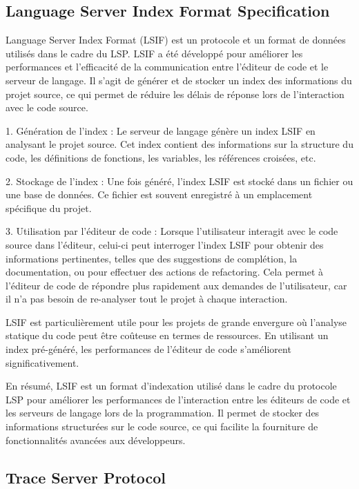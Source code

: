 \subsection{Language Server Index Format Specification}

Language Server Index Format (LSIF) est un protocole et un format de données utilisés dans le cadre du LSP. LSIF a été développé pour améliorer les performances et l'efficacité de la communication entre l'éditeur de code et le serveur de langage. Il s'agit de générer et de stocker un index des informations du projet source, ce qui permet de réduire les délais de réponse lors de l'interaction avec le code source.

1. Génération de l'index : Le serveur de langage génère un index LSIF en analysant le projet source. Cet index contient des informations sur la structure du code, les définitions de fonctions, les variables, les références croisées, etc.

2. Stockage de l'index : Une fois généré, l'index LSIF est stocké dans un fichier ou une base de données. Ce fichier est souvent enregistré à un emplacement spécifique du projet.

3. Utilisation par l'éditeur de code : Lorsque l'utilisateur interagit avec le code source dans l'éditeur, celui-ci peut interroger l'index LSIF pour obtenir des informations pertinentes, telles que des suggestions de complétion, la documentation, ou pour effectuer des actions de refactoring. Cela permet à l'éditeur de code de répondre plus rapidement aux demandes de l'utilisateur, car il n'a pas besoin de re-analyser tout le projet à chaque interaction.

LSIF est particulièrement utile pour les projets de grande envergure où l'analyse statique du code peut être coûteuse en termes de ressources. En utilisant un index pré-généré, les performances de l'éditeur de code s'améliorent significativement.

En résumé, LSIF est un format d'indexation utilisé dans le cadre du protocole LSP pour améliorer les performances de l'interaction entre les éditeurs de code et les serveurs de langage lors de la programmation. Il permet de stocker des informations structurées sur le code source, ce qui facilite la fourniture de fonctionnalités avancées aux développeurs.


\subsection{Trace Server Protocol}

